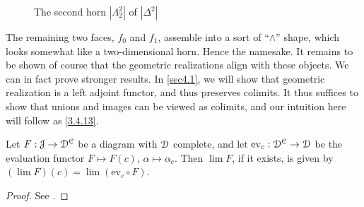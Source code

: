 \begin{intuition}
\begin{figure}[ht]
        \caption{The second horn $|\Lambda_2^2|$ of $|\Delta^2|$}
        \label{fig:6}
    \end{figure}
    The remaining two faces, $f_0$ and $f_1$, assemble into a sort of ``$\wedge$'' shape, which looks somewhat like a two-dimensional horn. Hence the namesake. It remains to be shown of course that the geometric realizations align with these objects. We can in fact prove stronger results. In \cref{sec4.1}, we will show that geometric realization is a left adjoint functor, and thus preserves colimits. It thus suffices to show that unions and images can be viewed as colimits, and our intuition here will follow as \cref{3.4.13}.
\end{intuition}


\begin{proposition}\label{3.4.11}
    Let $F : \mathcal{J}\to\mathcal{D}^{\mathcal{C}}$ be a diagram with $\mathcal{D}$ complete, and let $\mathrm{ev}_c:\mathcal{D}^{\mathcal{C}}\to\mathcal{D}$ be the evaluation functor $F\mapsto F(c)$, $\alpha\mapsto\alpha_c$. Then $\lim F$, if it exists, is given by $(\lim F)(c)=\lim (\mathrm{ev}_c\circ F)$.
\end{proposition}
\begin{proof}
    See \cite[\S5.3~Thm.~1]{ml}.
\end{proof}

